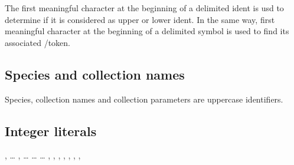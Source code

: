 The first meaningful character at the beginning of a delimited
ident is usd to determine if it is considered as upper or lower
ident. In the same way, first meaningful character at the beginning of a
delimited symbol is used to find its associated /token.

\subsection{Species and collection names}
 Species, collection
names and collection parameters are uppercase identifiers.

\subsection{Integer literals}
\label{integer literals}
\label{octal}
\label{hexadecimal}
\label{binary}

\begin{syn}
 \is {} \orelse {}
\sep
{} \is {} \ldots {}
\sep
{} \is
   \ldots {}
  \orelse {} \ldots {}
  \orelse {} \ldots {}
\sep
{} \is \tok{+} \orelse \tok{-}
\sep
{} \is
   
   
\sep
{} \is
   
   
\sep
{} \is
   
\sep
{} \is
   
   
\sep
{} \is
\alt {}
\alt {}
\alt {}
\sep
{} \is
   
\end{syn}

